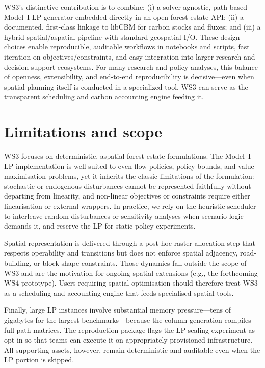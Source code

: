 \documentclass[review]{elsarticle}
\begin{document}
WS3’s distinctive contribution is to combine: (i) a solver-agnostic, path-based Model~I LP generator embedded directly in an open forest estate API; (ii) a documented, first-class linkage to libCBM for carbon stocks and fluxes; and (iii) a hybrid spatial/aspatial pipeline with standard geospatial I/O. These design choices enable reproducible, auditable workflows in notebooks and scripts, fast iteration on objectives/constraints, and easy integration into larger research and decision-support ecosystems. For many research and policy analyses, this balance of openness, extensibility, and end-to-end reproducibility is decisive—even when spatial planning itself is conducted in a specialized tool, WS3 can serve as the transparent scheduling and carbon accounting engine feeding it.

\section{Limitations and scope}
WS3 focuses on deterministic, aspatial forest estate formulations. The Model~I LP implementation is well suited to even-flow policies, policy bounds, and value-maximisation problems, yet it inherits the classic limitations of the formulation: stochastic or endogenous disturbances cannot be represented faithfully without departing from linearity, and non-linear objectives or constraints require either linearisation or external wrappers. In practice, we rely on the heuristic scheduler to interleave random disturbances or sensitivity analyses when scenario logic demands it, and reserve the LP for static policy experiments.

Spatial representation is delivered through a post-hoc raster allocation step that respects operability and transitions but does not enforce spatial adjacency, road-building, or block-shape constraints. Those dynamics fall outside the scope of WS3 and are the motivation for ongoing spatial extensions (e.g., the forthcoming WS4 prototype). Users requiring spatial optimisation should therefore treat WS3 as a scheduling and accounting engine that feeds specialised spatial tools.

Finally, large LP instances involve substantial memory pressure—tens of gigabytes for the largest benchmarks—because the column generation compiles full path matrices. The reproduction package flags the LP scaling experiment as opt-in so that teams can execute it on appropriately provisioned infrastructure. All supporting assets, however, remain deterministic and auditable even when the LP portion is skipped.
\end{document}
